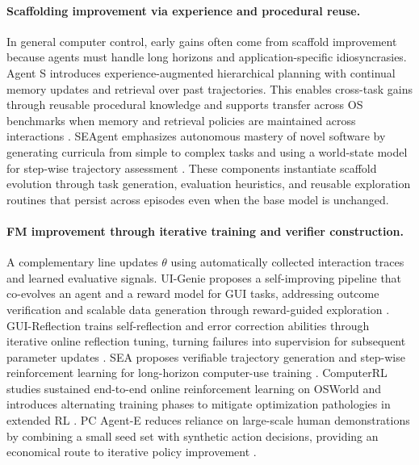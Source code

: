 \paragraph{Scaffolding improvement via experience and procedural reuse.}
In general computer control, early gains often come from scaffold improvement because agents must handle long horizons and application-specific idiosyncrasies. Agent S introduces experience-augmented hierarchical planning with continual memory updates and retrieval over past trajectories. This enables cross-task gains through reusable procedural knowledge and supports transfer across OS benchmarks when memory and retrieval policies are maintained across interactions \citep{agashe2024agentsopenagentic}. SEAgent emphasizes autonomous mastery of novel software by generating curricula from simple to complex tasks and using a world-state model for step-wise trajectory assessment \citep{sun2025seagentselfevolvingcomputeruse}. These components instantiate scaffold evolution through task generation, evaluation heuristics, and reusable exploration routines that persist across episodes even when the base model is unchanged.

\paragraph{FM improvement through iterative training and verifier construction.}
A complementary line updates $\theta$ using automatically collected interaction traces and learned evaluative signals. UI-Genie proposes a self-improving pipeline that co-evolves an agent and a reward model for GUI tasks, addressing outcome verification and scalable data generation through reward-guided exploration \citep{xiao2025uigenie}. GUI-Reflection trains self-reflection and error correction abilities through iterative online reflection tuning, turning failures into supervision for subsequent parameter updates \citep{wu2025guireflectionempoweringmultimodalgui}. SEA proposes verifiable trajectory generation and step-wise reinforcement learning for long-horizon computer-use training \citep{cheng2026evolvingtasksempoweringmultimodality}. ComputerRL studies sustained end-to-end online reinforcement learning on OSWorld and introduces alternating training phases to mitigate optimization pathologies in extended RL \citep{lai2026computerrl}. PC Agent-E reduces reliance on large-scale human demonstrations by combining a small seed set with synthetic action decisions, providing an economical route to iterative policy improvement \citep{he2026efficient}.


